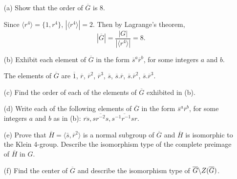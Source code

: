 \documentclass[12pt]{article}
\begin{document}
\begin{enumerate}
\begin{enumerate}
\item[(a)] Show that the order of $\overline{G}$ is 8.
\begin{mybox}
    
    Since $\langle r^4\rangle=\{1, r^4\}$,
    $|\langle r^4\rangle|=2$. Then by Lagrange's theorem,
    $$|\overline{G}|=\frac{|G|}{|\langle r^4\rangle|}=8.$$
\end{mybox}

\item[(b)] Exhibit each element of $\overline{G}$ in the form
$\overline{s}^a\overline{r}^b$, for some integers $a$ and $b$.
\begin{mybox}
    
    The elements of $\overline{G}$ are
    $\overline{1}$,  $\overline{r}$, $\overline{r}^2$,
    $\overline{r}^3$,  $\overline{s}$,
    $\overline{s}.\overline{r}$,
    $\overline{s}.\overline{r}^2$,
    $\overline{s}.\overline{r}^3$.
\end{mybox}

\item[(c)] Find the order of each of the elements of
$\overline{G}$
exhibited in (b).
\begin{mybox}
    
\end{mybox}

\item[(d)] Write each of the following elements of
$\overline{G}$
in the form $\overline{s}^a\overline{r}^b$, for some
integers $a$ and
$b$ as in (b): $\overline{rs}, \overline{sr^{-2}s},
\overline{s^{-1}r^{-1}sr}$.
\begin{mybox}
    
\end{mybox}

\item[(e)] Prove that $\overline{H} = \langle\bar{s},
\overline{r}^2\rangle$
is a normal subgroup of $\overline{G}$ and $\overline{H}$ is
isomorphic to the Klein
4-group. Describe the isomorphism type of the complete preimage
of $\overline{H}$ in $G$.
\begin{mybox}
    
\end{mybox}

\item[(f)] Find the center of $\overline{G}$ and describe
the isomorphism type
of $\overline{G}\char`\\Z(\overline{G})$.
\begin{mybox}
    
\end{mybox}


\end{enumerate}
\end{enumerate}
\end{document}
